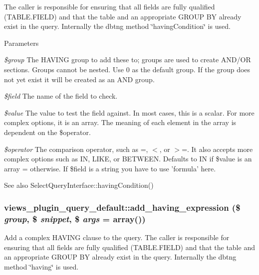The caller is responsible for ensuring that all fields are fully qualified (TABLE.FIELD) and that the table and an appropriate GROUP BY already exist in the query. Internally the dbtng method \char`\"{}havingCondition\char`\"{} is used.


\begin{DoxyParams}{Parameters}
\item[{\em \$group}]The HAVING group to add these to; groups are used to create AND/OR sections. Groups cannot be nested. Use 0 as the default group. If the group does not yet exist it will be created as an AND group. \item[{\em \$field}]The name of the field to check. \item[{\em \$value}]The value to test the field against. In most cases, this is a scalar. For more complex options, it is an array. The meaning of each element in the array is dependent on the \$operator. \item[{\em \$operator}]The comparison operator, such as =, $<$, or $>$=. It also accepts more complex options such as IN, LIKE, or BETWEEN. Defaults to IN if \$value is an array = otherwise. If \$field is a string you have to use 'formula' here.\end{DoxyParams}
\begin{DoxySeeAlso}{See also}
SelectQueryInterface::havingCondition() 
\end{DoxySeeAlso}
\hypertarget{classviews__plugin__query__default_a04031a4ad7be93ad612c37e09596e814}{
\subsubsection[{add\_\-having\_\-expression}]{\setlength{\rightskip}{0pt plus 5cm}views\_\-plugin\_\-query\_\-default::add\_\-having\_\-expression (\$ {\em group}, \/  \$ {\em snippet}, \/  \$ {\em args} = {\ttfamily array()})}}
\label{classviews__plugin__query__default_a04031a4ad7be93ad612c37e09596e814}
Add a complex HAVING clause to the query. The caller is responsible for ensuring that all fields are fully qualified (TABLE.FIELD) and that the table and an appropriate GROUP BY already exist in the query. Internally the dbtng method \char`\"{}having\char`\"{} is used.


